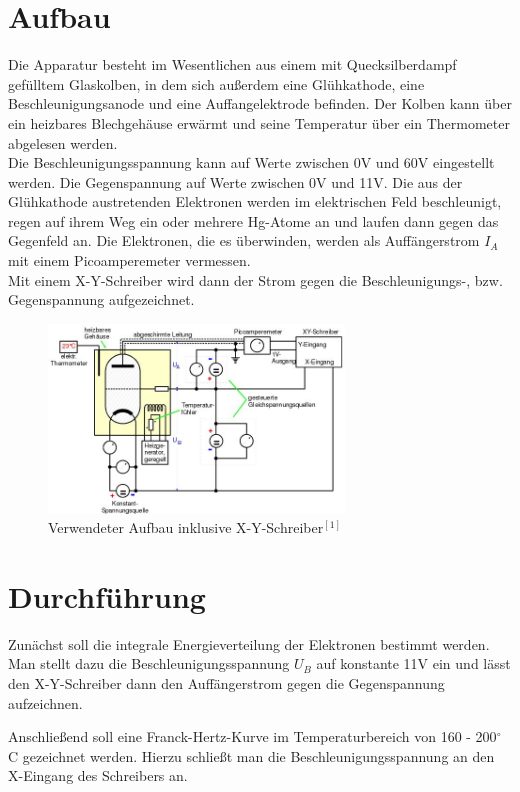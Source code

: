 \section{Aufbau}
Die Apparatur besteht im Wesentlichen aus einem mit Quecksilberdampf gefülltem Glaskolben, in dem sich außerdem eine Glühkathode, eine Beschleunigungsanode und eine Auffangelektrode befinden. Der Kolben kann über ein heizbares Blechgehäuse erwärmt und seine Temperatur über ein Thermometer abgelesen werden.\\
Die Beschleunigungsspannung kann auf Werte zwischen 0V und 60V eingestellt werden. Die Gegenspannung auf Werte zwischen 0V und 11V. Die aus der Glühkathode austretenden Elektronen werden im elektrischen Feld beschleunigt, regen auf ihrem Weg ein oder mehrere Hg-Atome an und laufen dann gegen das Gegenfeld an. Die Elektronen, die es überwinden, werden als Auffängerstrom $I_A$ mit einem Picoamperemeter vermessen.\\
Mit einem X-Y-Schreiber wird dann der Strom gegen die Beschleunigungs-, bzw. Gegenspannung aufgezeichnet.
\begin{figure}[htbp]
\includegraphics[width=0.7\textwidth]{pics/aufbau_detail.jpeg}
\caption{Verwendeter Aufbau inklusive X-Y-Schreiber$^{[1]}$}
\end{figure}
\section{Durchführung}
Zunächst soll die integrale Energieverteilung der Elektronen bestimmt werden. Man stellt dazu die Beschleunigungsspannung $U_B$ auf konstante 11V ein und lässt den X-Y-Schreiber dann den Auffängerstrom gegen die Gegenspannung aufzeichnen.

Anschließend soll eine Franck-Hertz-Kurve im Temperaturbereich von 160 - 200$^\circ$ C gezeichnet werden. Hierzu schließt man die Beschleunigungsspannung an den X-Eingang des Schreibers an.

